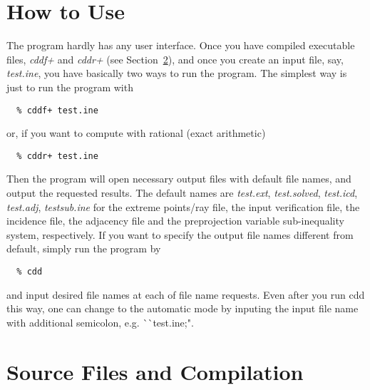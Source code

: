 \section{How to Use}  \label{HOWTO}

The program hardly has any user interface.  Once you have compiled
executable files,   {\em cddf+\/} and {\em cddr+\/} (see Section~\ref{CAUTIONS}), 
and once you create an input file,
say, {\em test.ine\/}, you have basically two ways to run the program.
The simplest way is just to run the program with 
\begin{verbatim}
  % cddf+ test.ine
\end{verbatim}
or, if you want to compute with rational (exact arithmetic)
\begin{verbatim}
  % cddr+ test.ine
\end{verbatim}
Then the program will open necessary output files with
default file names, and output the requested results.
The default names are {\em test.ext\/}, {\em test.solved\/}, {\em test.icd\/}, {\em test.adj\/},
{\em testsub.ine\/} for the extreme points/ray file, 
the input verification file, the incidence
file, the adjacency file and the preprojection variable sub-inequality
system, respectively.  If you want to specify the output file names
different from default, simply run the program by
\begin{verbatim}
  % cdd
\end{verbatim}
and input desired file names at each of file name requests.
Even after you run cdd this way, one can 
change to the automatic mode by inputing the input file 
name with additional semicolon, e.g. ^^ ^^ test.ine;".

\section{Source Files and Compilation}  \label{CAUTIONS}

